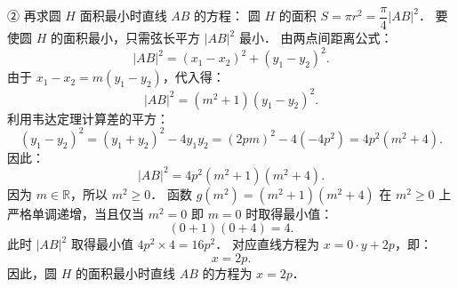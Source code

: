 \begin{answer}
② 再求圆 $H$ 面积最小时直线 $AB$ 的方程：
圆 $H$ 的面积 $S = \pi r^2 = \dfrac{\pi}{4}|AB|^2$．
要使圆 $H$ 的面积最小，只需弦长平方 $|AB|^2$ 最小．
由两点间距离公式：
\nopagebreak[4]
\[
|AB|^2 = (x_1 - x_2)^2 + (y_1 - y_2)^2.
\]
由于 $x_1 - x_2 = m(y_1 - y_2)$，代入得：
\nopagebreak[4]
\[
|AB|^2 = (m^2 + 1)(y_1 - y_2)^2.
\]
利用韦达定理计算差的平方：
\nopagebreak[4]
\[
(y_1 - y_2)^2 = (y_1 + y_2)^2 - 4y_1 y_2 = (2pm)^2 - 4(-4p^2) = 4p^2(m^2 + 4).
\]
因此：
\nopagebreak[4]
\[
|AB|^2 = 4p^2(m^2 + 1)(m^2 + 4).
\]
因为 $m \in \mathbb{R}$，所以 $m^2 \geqslant 0$．
函数 $g(m^2) = (m^2 + 1)(m^2 + 4)$ 在 $m^2 \geqslant 0$ 上严格单调递增，当且仅当 $m^2 = 0$ 即 $m = 0$ 时取得最小值：
\nopagebreak[4]
\[
(0 + 1)(0 + 4) = 4.
\]
此时 $|AB|^2$ 取得最小值 $4p^2 \times 4 = 16p^2$．
对应直线方程为 $x = 0 \cdot y + 2p$，即：
\nopagebreak[4]
\[
x = 2p.
\]
因此，圆 $H$ 的面积最小时直线 $AB$ 的方程为 $x = 2p$．


\end{answer}

